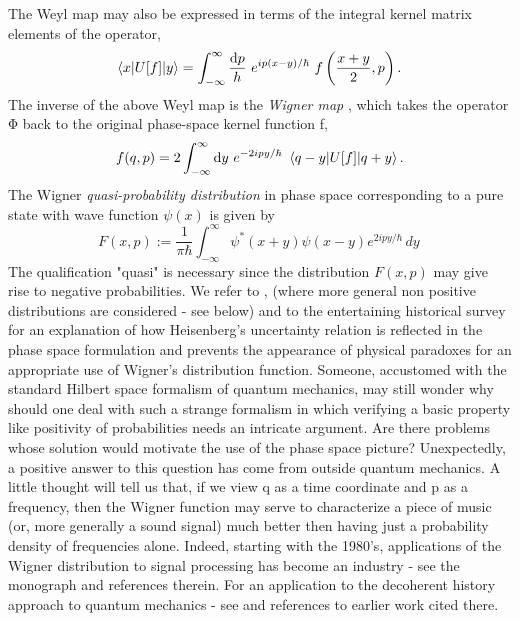 The Weyl map may also be expressed in terms of the integral kernel matrix elements of the operator,
\begin{equation}
\label{kern}
    \left\langle x| U [f] |y \right\rangle = \int_{-\infty}^\infty {{\rm d}p\over h} ~e^{ip(x-y)/\hbar}~ f\left({x+y\over2},p\right) . 
\end{equation}
The inverse of the above Weyl map is the {\it Wigner map} \cite{W32}, which takes the operator Φ back to the original phase-space kernel function f,
\begin{equation}
\label{Wigner}
    f(q,p)= 2 \int_{-\infty}^\infty {\rm d}y~e^{-2ipy/\hbar}~ \left\langle q-y| U [f] |q+y \right\rangle. 
\end{equation}
The Wigner {\it quasi-probability distribution} in phase space corresponding to a pure state with wave function $\psi(x)$ is given by
\begin{equation}
\label{Wigpsi}
    F(x,p):= \frac{1}{\pi\hbar}\int_{-\infty}^\infty \psi^*(x+y)\psi(x-y)e^{2ipy/\hbar}\,dy\, 
\end{equation}
The qualification "quasi" is necessary since the distribution $F(x, p)$ may give rise to negative probabilities. We refer to \cite{M86}, \cite{Fe} (where more general non positive distributions are considered - see below) and to the entertaining historical survey \cite{CZ} for an explanation of how Heisenberg's uncertainty relation is reflected in the phase space formulation and prevents the appearance of physical paradoxes for an appropriate use of Wigner's distribution function. Someone, accustomed with the standard Hilbert space formalism of quantum mechanics, may still wonder why should one deal with such a strange formalism in which verifying a basic property like positivity of probabilities needs an intricate argument. Are there problems whose solution would motivate the use of the phase space picture?  Unexpectedly, a positive answer to this question has come from outside quantum mechanics. A little thought will tell us that, if we view q as a time coordinate and p as a frequency, then the Wigner function may serve to characterize a piece of music (or, more generally a sound signal) much better then having just a probability density of frequencies alone. Indeed, starting with the 1980's, applications of the Wigner distribution to signal processing has become an industry - see the monograph \cite{MH} and references therein. For an application to the decoherent history approach to quantum mechanics - see \cite{GH} and references to earlier work cited there. 

